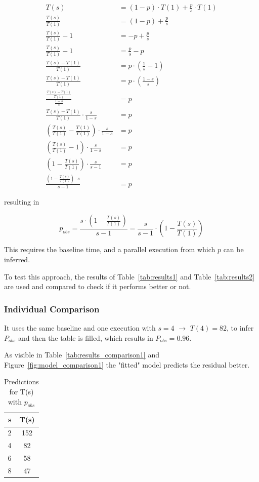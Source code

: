 \documentclass[a4paper, 12pt]{article}
\begin{document}
	\begin{align*}
		T(s) &= (1 - p) \cdot T(1) + \frac{p}{s} \cdot T(1) \\[7pt]
		\frac{T(s)}{T(1)} &= (1-p) + \frac{p}{s} \\[7pt]
		\frac{T(s)}{T(1)} -1 &= -p + \frac{p}{s} \\[7pt]
		\frac{T(s)}{T(1)} -1 &= \frac{p}{s} -p \\[7pt]
		\frac{T(s) - T(1)}{T(1)} &= p \cdot \left(\frac{1}{s} - 1\right) \\[7pt]
		\frac{T(s) - T(1)}{T(1)} &= p \cdot \left(\frac{1-s}{s}\right) \\[7pt]
		\frac{\frac{T(s) - T(1)}{T(1)}}{\frac{1-s}{s}} &= p \\[7pt]
		\frac{T(s) - T(1)}{T(1)} \cdot \frac{s}{1-s} &= p \\[7pt]
		\left(\frac{T(s)}{T(1)} - \frac{T(1)}{T(1)}\right) \cdot \frac{s}{1-s} &= p \\[7pt]
		\left(\frac{T(s)}{T(1)} - 1\right) \cdot \frac{s}{1-s} &= p \\[7pt]
		\left(1 - \frac{T(s)}{T(1)}\right) \cdot \frac{s}{s-1} &= p \\[7pt]
		\frac{\left(1 - \frac{T(s)}{T(1)}\right) \cdot s}{s - 1} &= p
	\end{align*}
	
	resulting in
	
	\[
	p_{obs} = \frac{s \cdot \left(1 - \frac{T(s)}{T(1)}\right)}{s-1} = \frac{s}{s-1} \cdot \left(1 - \frac{T(s)}{T(1)}\right)
	\]
	
	
	This requires the baseline time, and a parallel execution from which $p$ can be inferred. 
	
	To test this approach, the results of Table~\ref{tab:results1} and Table~\ref{tab:results2} are used and compared to check if it performs better or not.
	
	\subsubsection*{Individual Comparison}
	
	It uses the same baseline and one execution with $s = 4$ $\rightarrow$ $T(4) = 82$, to infer $P_{obs}$ and then the table is filled, which results in $P_{obs} = 0.96$.
	
	As visible in Table~\ref{tab:results_comparison1} and Figure~\ref{fig:model_comparison1} the "fitted" model predicts the residual better.
	
	
	\begin{table}[h!]
		\centering
		\vspace{0.2cm} %
		\begin{tabular}{cc}
			\toprule
			\textbf{s} & \textbf{T(s)} \\
			\midrule
			2 & 152 \\
			4 & 82 \\
			6 & 58 \\
			8 & 47\\
			\bottomrule
		\end{tabular}
		\caption{Predictions for T(s) with $p_{obs}$}
		\label{tab:predictions1}
	\end{table}
	
\end{document}
